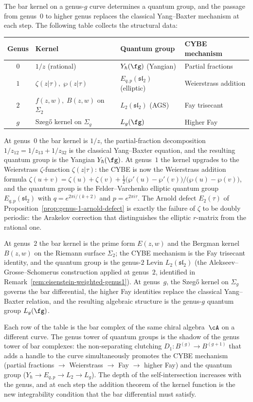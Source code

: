 The bar kernel on a genus-$g$ curve determines a quantum group, and
the passage from genus~$0$ to higher genus replaces the classical
Yang--Baxter mechanism at each step. The following table collects
the structural data:
\begin{center}
\renewcommand{\arraystretch}{1.4}
\begin{tabular}{@{}clll@{}}
\textbf{Genus} & \textbf{Kernel} & \textbf{Quantum group}
 & \textbf{CYBE mechanism} \\
\hline
$0$ & $1/z$ (rational) & $Y_\hbar(\fg)$ (Yangian) & Partial fractions \\
$1$ & $\zeta(z|\tau),\;\wp(z|\tau)$
 & $E_{q,p}(\mathfrak{sl}_2)$ (elliptic) & Weierstrass addition \\
$2$ & $f(z,w),\;B(z,w)$ on $\Sigma_2$
 & $L_2(\mathfrak{sl}_2)$ (AGS) & Fay trisecant \\
$g$ & Szeg\H{o} kernel on $\Sigma_g$
 & $L_g(\fg)$ & Higher Fay
\end{tabular}
\end{center}
At genus~$0$ the bar kernel is $1/z$, the partial-fraction
decomposition $1/z_{12} = 1/z_{13} + 1/z_{32}$ is the classical
Yang--Baxter equation, and the resulting quantum group is the
Yangian $Y_\hbar(\fg)$. At genus~$1$ the kernel upgrades to the
Weierstrass $\zeta$-function $\zeta(z|\tau)$: the CYBE is now
the Weierstrass addition formula
$\zeta(u+v) = \zeta(u) + \zeta(v) + \tfrac{1}{2}\bigl(\wp'(u)
- \wp'(v)\bigr)/\bigl(\wp(u) - \wp(v)\bigr)$,
and the quantum group is the Felder--Varchenko elliptic quantum
group $E_{q,p}(\mathfrak{sl}_2)$ with $q = e^{2\pi i/(k+2)}$
and $p = e^{2\pi i\tau}$. The Arnold defect $E_2(\tau)$ of
Proposition~\ref{prop:genus-1-arnold-defect} is exactly the
failure of $\zeta$ to be doubly periodic: the Arakelov correction
that distinguishes the elliptic $r$-matrix from the rational one.

At genus~$2$ the bar kernel is the prime form $E(z,w)$ and the
Bergman kernel $B(z,w)$ on the Riemann surface $\Sigma_2$; the
CYBE mechanism is the Fay trisecant identity, and the quantum
group is the genus-$2$ Levin $L_2(\mathfrak{sl}_2)$ (the
Alekseev--Grosse--Schomerus construction applied at genus~$2$,
identified in Remark~\ref{rem:eisenstein-weighted-genus1}). At
genus~$g$, the Szeg\H{o} kernel on $\Sigma_g$ governs the bar
differential, the higher Fay identities replace the classical
Yang--Baxter relation, and the resulting algebraic structure is
the genus-$g$ quantum group $L_g(\fg)$.

Each row of the table is the bar complex of the same chiral
algebra~$\cA$ on a different curve. The genus tower of quantum
groups is the shadow of the genus tower of bar complexes: the
non-separating clutching $D_1 \colon B^{(g)} \to B^{(g+1)}$ that
adds a handle to the curve simultaneously promotes the CYBE
mechanism (partial fractions $\to$ Weierstrass $\to$ Fay $\to$
higher Fay) and the quantum group ($Y_\hbar \to E_{q,p} \to
L_2 \to L_g$). The depth of the self-intersection increases
with the genus, and at each step the addition theorem of the
kernel function is the new integrability condition that the bar
differential must satisfy.

